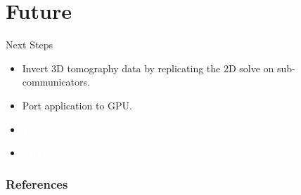 \documentclass{beamer}
\begin{document}
\section{Future}
\begin{frame}{Next Steps}
	\begin{itemize}
		\item Invert 3D tomography data by replicating the 2D solve on sub-communicators.
		\item Port application to GPU.
	\end{itemize}
\end{frame}

{ 
	\begin{frame}
		\begin{center}
			\begin{itemize}
				\item[] {\Large \textcolor{white}{Thank you!}}
			\end{itemize}			
		\end{center}
		\begin{itemize}
			\item \textcolor{white} {PETSc-Users mailing list.}
		\end{itemize}
	\end{frame}
}
\renewcommand*{\bibfont}{\scriptsize}
\begin{frame}[t, allowframebreaks]
	\frametitle{References}
	
	
\end{frame}
\end{document}
